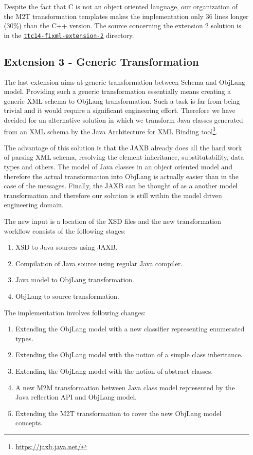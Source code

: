 Despite the fact that C is not an object oriented language, our organization of the M2T transformation templates makes the implementation only 36 lines longer (30\%) than the C++ version.
The source concerning the extension 2 solution is in the \href{https://github.com/fikovnik/ttc14-fixml-sigma/tree/master/ttc14-fixml-extension-2}{\texttt{ttc14-fixml-extension-2}} directory.

\subsection{Extension 3 - Generic Transformation}
\label{sec:Extension3}

The last extension aims at generic transformation between \FIXML Schema and ObjLang model.
Providing such a generic transformation essentially means creating a generic XML schema to ObjLang transformation.
Such a task is far from being trivial and it would require a significant engineering effort.
Therefore we have decided for an alternative solution in which we transform Java classes generated from an XML schema by the Java Architecture for XML Binding tool\footnote{\url{https://jaxb.java.net/}}.

The advantage of this solution is that the JAXB already does all the hard work of parsing XML schema, resolving the element inheritance, substitutability, data types and others.
The model of Java classes in an object oriented model and therefore the actual transformation into ObjLang is actually easier than in the case of the \FIXML messages.
Finally, the JAXB can be thought of as a another model transformation and therefore our solution is still within the model driven engineering domain.

The new input is a location of the \FIXML XSD files and the new transformation workflow consists of the following stages:
\begin{enumerate}[(1)]
	\item XSD to Java sources using JAXB.
	\item Compilation of Java source using regular Java compiler.
	\item Java model to ObjLang transformation.
	\item ObjLang to source transformation.
\end{enumerate}

\bigskip

The implementation involves following changes:
\begin{enumerate}[(1)]
	\item Extending the ObjLang model with a new classifier representing enumerated types.
	\item Extending the ObjLang model with the notion of a simple class inheritance.
	\item Extending the ObjLang model with the notion of abstract classes.
	\item A new M2M transformation between Java class model represented by the Java reflection API and ObjLang model.
	\item Extending the M2T transformation to cover the new ObjLang model concepts.
\end{enumerate}


